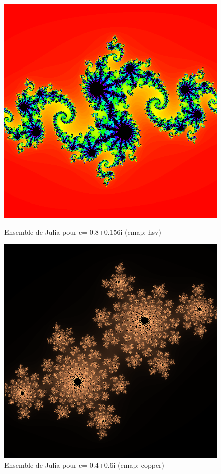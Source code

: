             \begin{figure}[h]
                \centering
                \begin{minipage}[b]{0.45\textwidth}
                    \includegraphics[width=\textwidth]{images/julia(c=(-0.800000,0.156000xi)).png}
                    \caption{Ensemble de Julia pour c=-0.8+0.156i (cmap: hsv)}
                    \label{fig:julia3}
                \end{minipage}
                \hfill
                \begin{minipage}[b]{0.45\textwidth}
                    \includegraphics[width=\textwidth]{images/julia(c=(-0.400000,0.600000xi)).png}
                    \caption{Ensemble de Julia pour c=-0.4+0.6i (cmap: copper)}
                    \label{fig:julia4}
                \end{minipage}
            \end{figure}
            \newpage
